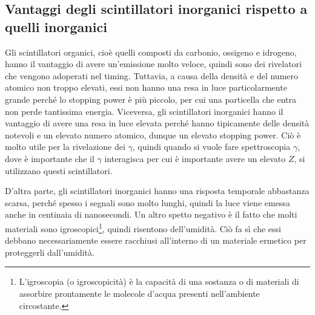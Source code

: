 \subsection{Vantaggi degli scintillatori inorganici rispetto a quelli inorganici}

Gli scintillatori organici, cioè quelli composti da carbonio, ossigeno e idrogeno, hanno il vantaggio di avere un'emissione molto veloce, quindi sono dei rivelatori che vengono adoperati nel timing. Tuttavia, a causa della densità e del numero atomico non troppo elevati, essi non hanno una resa in luce particolarmente grande perché lo stopping power è più piccolo, per cui una particella che entra non perde tantissima energia. Viceversa, gli scintillatori inorganici hanno il vantaggio di avere una resa in luce elevata perché hanno tipicamente delle densità notevoli e un elevato numero atomico, dunque un elevato stopping power. Ciò è molto utile per la rivelazione dei $\gamma$, quindi quando si vuole fare spettroscopia $\gamma$, dove è importante che il $\gamma$ interagisca per cui è importante avere un elevato $Z$, si utilizzano questi scintillatori.

D'altra parte, gli scintillatori inorganici hanno una risposta temporale abbastanza scarsa, perché spesso i segnali sono molto lunghi, quindi la luce viene emessa anche in centinaia di nanosecondi. Un altro spetto negativo è il fatto che molti materiali sono igroscopici\footnote{L'igroscopia (o igroscopicità) è la capacità di una sostanza o di materiali di assorbire prontamente le molecole d'acqua presenti nell'ambiente circostante.}, quindi risentono dell'umidità. Ciò fa sì che essi debbano necessariamente essere racchiusi all'interno di un materiale ermetico per proteggerli dall'umidità. 


